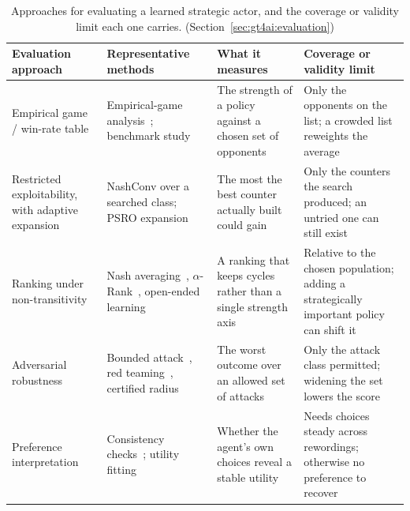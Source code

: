 \begin{table}[pos=t]
\centering
\caption{Approaches for evaluating a learned strategic actor, and the coverage or
validity limit each one carries. (Section~\ref{sec:gt4ai:evaluation})}
\label{tab:evaluation_methods}
\footnotesize
\setlength{\tabcolsep}{3.5pt}
\renewcommand{\arraystretch}{1.25}

\begin{tabularx}{\textwidth}{
    >{\raggedright\arraybackslash}p{}
    >{\raggedright\arraybackslash}p{}
    Y
    Y
}
\toprule
\textbf{Evaluation approach}
& \textbf{Representative methods}
& \textbf{What it measures}
& \textbf{Coverage or validity limit}
\\
\midrule

Empirical game / win-rate table
& Empirical-game analysis~\citep{Wellman2006}; benchmark study~\citep{Balduzzi2018}
& The strength of a policy against a chosen set of opponents
& Only the opponents on the list; a crowded list reweights the average
\\

\addlinespace

Restricted exploitability, with adaptive expansion
& NashConv over a searched class; PSRO expansion~\citep{Lanctot2017}
& The most the best counter actually built could gain
& Only the counters the search produced; an untried one can still exist
\\

\addlinespace

Ranking under non-transitivity
& Nash averaging~\citep{Balduzzi2018}, $\alpha$-Rank~\citep{Omidshafiei2019},
open-ended learning~\citep{Balduzzi2019Open}
& A ranking that keeps cycles rather than a single strength axis
& Relative to the chosen population; adding a strategically important policy can
shift it
\\

\addlinespace

Adversarial robustness
& Bounded attack~\citep{Madry2018}, red teaming~\citep{Perez2022}, certified
radius~\citep{CohenRosenfeldKolter2019}
& The worst outcome over an allowed set of attacks
& Only the attack class permitted; widening the set lowers the score
\\

\addlinespace

Preference interpretation
& Consistency checks~\citep{RossKimLo2024}; utility fitting~\citep{Mazeika2025}
& Whether the agent's own choices reveal a stable utility
& Needs choices steady across rewordings; otherwise no preference to recover
\\
\bottomrule
\end{tabularx}
\end{table}

